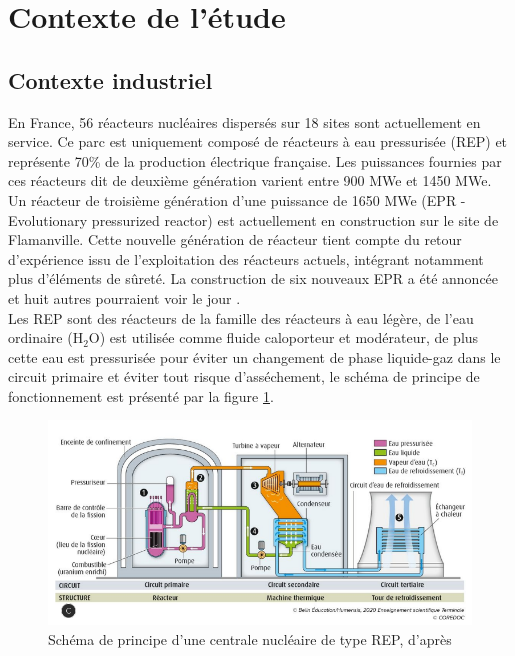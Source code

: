 \section{Contexte de l'étude}
\subsection{Contexte industriel}
En France, 56 réacteurs nucléaires dispersés sur 18 sites sont actuellement en service. Ce parc est uniquement composé de réacteurs à eau pressurisée (REP) et représente 70\% de la production électrique française. Les puissances fournies par ces réacteurs dit de deuxième génération varient entre 900 MWe et 1450 MWe. Un réacteur de troisième génération d'une puissance de 1650 MWe (EPR - Evolutionary pressurized reactor) est actuellement en construction sur le site de Flamanville. Cette nouvelle génération de réacteur tient compte du retour d'expérience issu de l'exploitation des réacteurs actuels, intégrant notamment plus d'éléments de sûreté. La construction de six nouveaux EPR a été annoncée et huit autres pourraient voir le jour \cite{noauthor_emmanuel_2021}. \\
Les REP sont des réacteurs de la famille des réacteurs à eau légère, de l'eau ordinaire (H$_2$O) est utilisée comme fluide caloporteur et modérateur, de plus cette eau est pressurisée pour éviter un changement de phase liquide-gaz dans le circuit primaire et éviter tout risque d'asséchement, le schéma de principe de fonctionnement est présenté par la figure \ref{fig:schcentrale1}. %
\begin{figure}[H]
	\centering
	\includegraphics[width=0.8\linewidth]{figure/sch_centrale1}
	\caption[Schéma de principe d'une centrale nucléaire de type REP]{Schéma de principe d'une centrale nucléaire de type REP, d'après \cite{noauthor_manuel_nodate}}
	\label{fig:schcentrale1}
\end{figure} 
